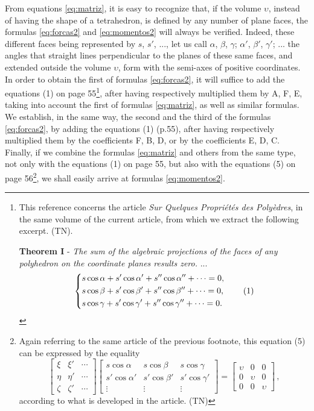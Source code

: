 \documentclass[leqno,openright,smallroyalvopaper,8pt,twoside,showtrims]{memoir}
\begin{document}
From equations \eqref{eq:matriz}, it is easy to recognize that, if the volume $\upsilon$, instead of having the shape of a tetrahedron, is defined by any number of plane faces, the formulas \eqref{eq:forcas2} and \eqref{eq:momentos2} will always be verified. Indeed, these different faces being represented by $s$, $s'$, ..., let us call $\alpha$, $\beta$, $\gamma$; $\alpha'$, $\beta'$, $\gamma'$; ... the angles that straight lines perpendicular to the planes of these same faces, and extended outside the volume $\upsilon$, form with the semi-axes of positive coordinates. In order to obtain the first of formulas \eqref{eq:forcas2}, it will suffice to add the equations (1) on page 55\footnote{This reference concerns the article \textit{Sur Quelques Propri\'et\'es des Poly\`edres}, in the same volume of the current article, from which we extract the following excerpt. (TN).

\noindent\textbf{Theorem I} - \emph{The sum of the algebraic projections of the faces of any polyhedron on the coordinate planes results zero.} ...
\begin{equation*}
   \begin{dcases}
s\cos\alpha+s'\cos\alpha'+s''\cos\alpha''+\cdots = 0,\\
s\cos\beta+s'\cos\beta'+s''\cos\beta''+\cdots = 0,\\
s\cos\gamma+s'\cos\gamma'+s''\cos\gamma''+\cdots = 0.
    \end{dcases}\tag{1}
 \end{equation*}
}, after having respectively multiplied them by A, F, E, taking into account the first of formulas \eqref{eq:matriz}, as well as similar formulas. We establish, in the same way, the second and the third of the formulas \eqref{eq:forcas2}, by adding the equations (1) (p.55), after having respectively multiplied them by the coefficients F, B, D, or by the coefficients E, D, C. Finally, if we combine the formulas \eqref{eq:matriz} and others from the same type, not only with the equations (1) on page 55, but also with the equations (5) on page 56\footnote{Again referring to the same article of the previous footnote, this equation (5) can be expressed by the equality
\begin{equation}\left[
   \begin{array}{ccc}
\xi & \xi' & \cdots\\
\eta & \eta' & \cdots\\
\zeta & \zeta' & \cdots
    \end{array}\right]\left[
   \begin{array}{ccc}
s\cos\alpha & s\cos\beta  & s\cos\gamma\\
s'\cos\alpha' & s'\cos\beta' & s'\cos\gamma'\\
\vdots & \vdots & \vdots
    \end{array}\right]=\left[
   \begin{array}{ccc}
\upsilon & 0 & 0\\
0 & \upsilon & 0\\
0 & 0 & \upsilon
    \end{array}\right]\,,\tag{5}
 \end{equation}
according to what is developed in the article. (TN)
}, we shall easily arrive at formulas \eqref{eq:momentos2}. 
\end{document}
